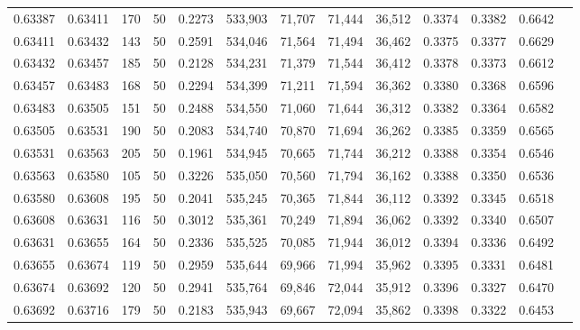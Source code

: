 \begin{tabular}{rrrrrrrrrrrrr}
0.63387 & 0.63411 &   170 &  50 &                                     0.2273 & 533,903 &  71,707 &  71,444 &  36,512 & 0.3374 & 0.3382 & 0.6642 \\
0.63411 & 0.63432 &   143 &  50 &                                     0.2591 & 534,046 &  71,564 &  71,494 &  36,462 & 0.3375 & 0.3377 & 0.6629 \\
0.63432 & 0.63457 &   185 &  50 &                                     0.2128 & 534,231 &  71,379 &  71,544 &  36,412 & 0.3378 & 0.3373 & 0.6612 \\
0.63457 & 0.63483 &   168 &  50 &                                     0.2294 & 534,399 &  71,211 &  71,594 &  36,362 & 0.3380 & 0.3368 & 0.6596 \\
0.63483 & 0.63505 &   151 &  50 &                                     0.2488 & 534,550 &  71,060 &  71,644 &  36,312 & 0.3382 & 0.3364 & 0.6582 \\
0.63505 & 0.63531 &   190 &  50 &                                     0.2083 & 534,740 &  70,870 &  71,694 &  36,262 & 0.3385 & 0.3359 & 0.6565 \\
0.63531 & 0.63563 &   205 &  50 &                                     0.1961 & 534,945 &  70,665 &  71,744 &  36,212 & 0.3388 & 0.3354 & 0.6546 \\
0.63563 & 0.63580 &   105 &  50 &                                     0.3226 & 535,050 &  70,560 &  71,794 &  36,162 & 0.3388 & 0.3350 & 0.6536 \\
0.63580 & 0.63608 &   195 &  50 &                                     0.2041 & 535,245 &  70,365 &  71,844 &  36,112 & 0.3392 & 0.3345 & 0.6518 \\
0.63608 & 0.63631 &   116 &  50 &                                     0.3012 & 535,361 &  70,249 &  71,894 &  36,062 & 0.3392 & 0.3340 & 0.6507 \\
0.63631 & 0.63655 &   164 &  50 &                                     0.2336 & 535,525 &  70,085 &  71,944 &  36,012 & 0.3394 & 0.3336 & 0.6492 \\
0.63655 & 0.63674 &   119 &  50 &                                     0.2959 & 535,644 &  69,966 &  71,994 &  35,962 & 0.3395 & 0.3331 & 0.6481 \\
0.63674 & 0.63692 &   120 &  50 &                                     0.2941 & 535,764 &  69,846 &  72,044 &  35,912 & 0.3396 & 0.3327 & 0.6470 \\
0.63692 & 0.63716 &   179 &  50 &                                     0.2183 & 535,943 &  69,667 &  72,094 &  35,862 & 0.3398 & 0.3322 & 0.6453 \\

\end{tabular}
